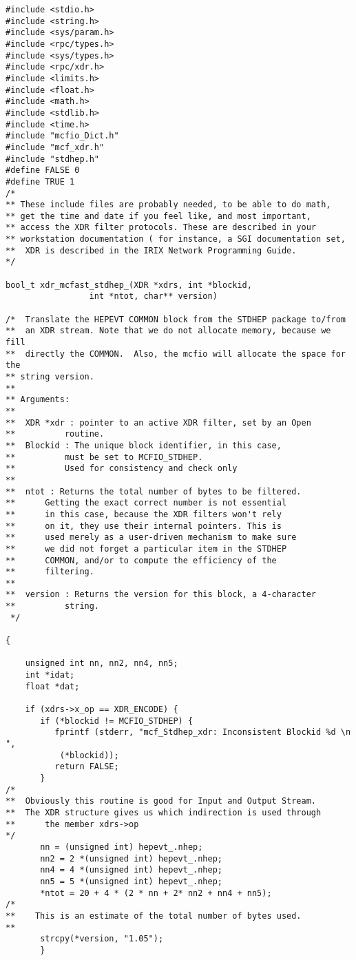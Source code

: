 \begin{verbatim}
#include <stdio.h>
#include <string.h>
#include <sys/param.h>
#include <rpc/types.h>
#include <sys/types.h>
#include <rpc/xdr.h>
#include <limits.h>
#include <float.h>
#include <math.h>
#include <stdlib.h>
#include <time.h>
#include "mcfio_Dict.h"
#include "mcf_xdr.h"
#include "stdhep.h"
#define FALSE 0
#define TRUE 1
/*
** These include files are probably needed, to be able to do math, 
** get the time and date if you feel like, and most important, 
** access the XDR filter protocols. These are described in your 
** workstation documentation ( for instance, a SGI documentation set,
**  XDR is described in the IRIX Network Programming Guide. 
*/

bool_t xdr_mcfast_stdhep_(XDR *xdrs, int *blockid,
 				 int *ntot, char** version)
 				 
/*  Translate the HEPEVT COMMON block from the STDHEP package to/from
**  an XDR stream. Note that we do not allocate memory, because we fill
**  directly the COMMON.  Also, the mcfio will allocate the space for the 
** string version. 
** 
** Arguments:
**
**	XDR *xdr : pointer to an active XDR filter, set by an Open 
**			routine.
**	Blockid : The unique block identifier, in this case, 
**			must be set to MCFIO_STDHEP. 
**			Used for consistency and check only
**
**	ntot : Returns the total number of bytes to be filtered.
**		Getting the exact correct number is not essential
**		in this case, because the XDR filters won't rely 
**		on it, they use their internal pointers. This is 
**		used merely as a user-driven mechanism to make sure 
**		we did not forget a particular item in the STDHEP 
**		COMMON, and/or to compute the efficiency of the 
**		filtering. 
**		
**	version : Returns the version for this block, a 4-character 
**			string. 
 */

{
    
    unsigned int nn, nn2, nn4, nn5;
    int *idat;
    float *dat;
    
    if (xdrs->x_op == XDR_ENCODE) {
       if (*blockid != MCFIO_STDHEP) {
          fprintf (stderr, "mcf_Stdhep_xdr: Inconsistent Blockid %d \n ", 
           (*blockid));
          return FALSE;
       }
/*
**	Obviously this routine is good for Input and Output Stream. 
**	The XDR structure gives us which indirection is used through 
**      the member xdrs->op
*/       
       nn = (unsigned int) hepevt_.nhep;
       nn2 = 2 *(unsigned int) hepevt_.nhep;
       nn4 = 4 *(unsigned int) hepevt_.nhep;
       nn5 = 5 *(unsigned int) hepevt_.nhep;
       *ntot = 20 + 4 * (2 * nn + 2* nn2 + nn4 + nn5);
/*
**    This is an estimate of the total number of bytes used. 
**	
       strcpy(*version, "1.05");
       } 
      

\end{verbatim}
